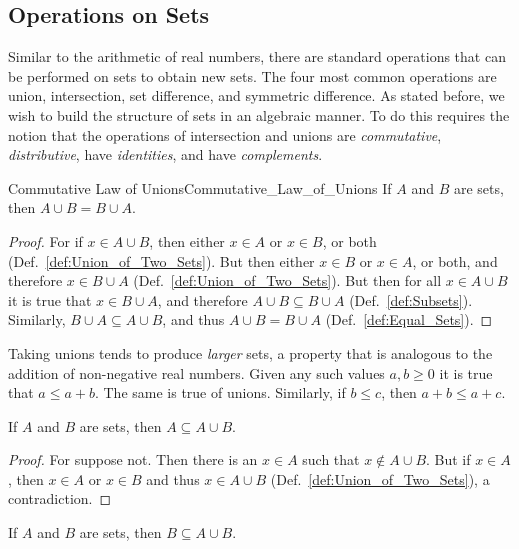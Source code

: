     \subsection{Operations on Sets}
        Similar to the arithmetic of real numbers, there are standard operations
        that can be performed on sets to obtain new sets. The four most common
        operations are union, intersection, set difference, and symmetric
        difference. As stated before, we wish to build the structure of sets in
        an algebraic manner. To do this requires the notion that the operations
        of intersection and unions are \textit{commutative},
        \textit{distributive}, have \textit{identities}, and have
        \textit{complements}.
        \begin{ltheorem}{Commutative Law of Unions}{Commutative_Law_of_Unions}
            If $A$ and $B$ are sets, then $A\cup{B}=B\cup{A}$.
        \end{ltheorem}
        \begin{proof}
            For if $x\in{A}\cup{B}$, then either $x\in{A}$ or $x\in{B}$, or both
            (Def.~\ref{def:Union_of_Two_Sets}). But then either $x\in{B}$ or
            $x\in{A}$, or both, and therefore $x\in{B}\cup{A}$
            (Def.~\ref{def:Union_of_Two_Sets}). But then for all
            $x\in{A}\cup{B}$ it is true that $x\in{B}\cup{A}$, and therefore
            $A\cup{B}\subseteq{B}\cup{A}$ (Def.~\ref{def:Subsets}). Similarly,
            $B\cup{A}\subseteq{A}\cup{B}$, and thus
            $A\cup{B}=B\cup{A}$ (Def.~\ref{def:Equal_Sets}).
        \end{proof}
        Taking unions tends to produce \textit{larger} sets, a property that is
        analogous to the addition of non-negative real numbers. Given any such
        values $a,b\geq{0}$ it is true that $a\leq{a}+b$. The same is true of
        unions. Similarly, if $b\leq{c}$, then $a+b\leq{a}+c$.
        \begin{theorem}
            \label{thm:Union_is_Bigger_Left}%
            If $A$ and $B$ are sets, then $A\subseteq{A}\cup{B}$.
        \end{theorem}
        \begin{proof}
            For suppose not. Then there is an $x\in{A}$ such that
            $x\notin{A}\cup{B}$. But if $x\in{A}$, then $x\in{A}$ or $x\in{B}$
            and thus $x\in{A}\cup{B}$ (Def.~\ref{def:Union_of_Two_Sets}), a
            contradiction.
        \end{proof}
        \begin{theorem}
            \label{thm:Union_is_Bigger_Right}%
            If $A$ and $B$ are sets, then $B\subseteq{A}\cup{B}$.
        \end{theorem}

